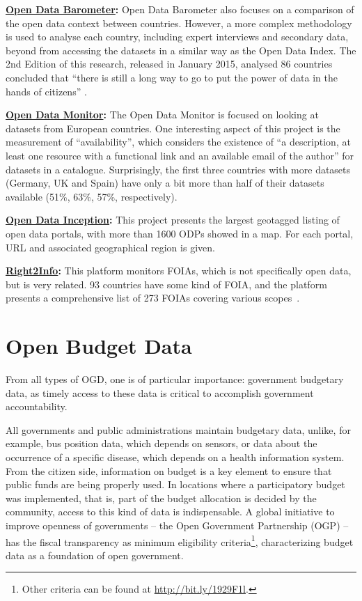 \textbf{\href{http://www.opendatabarometer.org/}{Open Data Barometer}:} Open Data Barometer also focuses on a comparison of the open data context between countries. However, a more complex methodology is used to analyse each country, including expert interviews and secondary data, beyond from accessing the datasets in a similar way as the Open Data Index.
The 2nd Edition of this research, released in January 2015, analysed 86 countries concluded that ``there is still a long way to go to put the power of data in the hands of citizens''\cite{Davies2015} .

\textbf{\href{http://opendatamonitor.eu/}{Open Data Monitor}:} The Open Data Monitor is focused on looking at datasets from European countries. One interesting aspect of this project is the measurement of ``availability'', which considers the existence of ``a description, at least one resource with a functional link and an available email of the author'' for datasets in a catalogue.
Surprisingly, the first three countries with more datasets (Germany, UK and Spain) have only a bit more than half of their datasets available (51\%, 63\%, 57\%, respectively).

\textbf{\href{http://opendatainception.io/}{Open Data Inception}:} This project presents the largest geotagged listing of open data portals, with more than 1600 ODPs showed in a map. For each portal, URL and associated geographical region is given.

\textbf{\href{http://right2info.org}{Right2Info}:} This platform monitors FOIAs, which is not specifically open data, but is very related. 93 countries have some kind of FOIA, and the platform presents a comprehensive list of 273 FOIAs covering various scopes~\cite{Vleugels2012}.

\section{Open Budget Data}
\label{sec:openbudget}

From all types of OGD, one is of particular importance: government budgetary data, as timely access to these data is critical to accomplish government accountability.

All governments and public administrations maintain budgetary data, unlike, for example, bus position data, which depends on sensors, or data about the occurrence of a specific disease, which depends on a health information system.
From the citizen side, information on budget is a key element to ensure that public funds are being properly used.
In locations where a participatory budget~\cite{Mkude2014} was implemented, that is, part of the budget allocation is decided by the community, access to this kind of data is indispensable.
A global initiative to improve openness of governments -- the Open Government Partnership (OGP) -- has the fiscal transparency as minimum eligibility criteria\footnote{Other criteria can be found at \url{http://bit.ly/1929F1l}.}, characterizing budget data as a foundation of open government.


